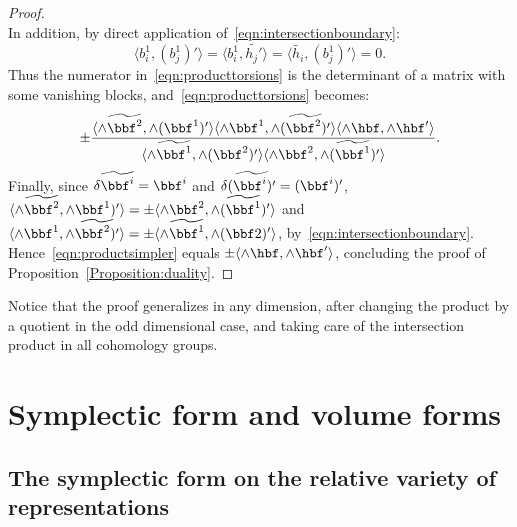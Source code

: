 \begin{proof}
\[\]
In addition, by direct application of~\eqref{eqn:intersectionboundary}:
\[
\langle { b^1_i}, (b^1_j)'\rangle =
\langle { b^1_i}, \widetilde{h_j'}\rangle =
\langle \widetilde {h_i}, (b^1_j)' \rangle=0.
\]
Thus the numerator in~\eqref{eqn:producttorsions} is the determinant of a matrix with some vanishing blocks, and~\eqref{eqn:producttorsions} becomes:
\begin{equation}\label{eqn:productsimpler}
\pm \frac{
\langle \wedge \widetilde{\bbf^2}, \wedge (\bbf^1)'\rangle
\langle \wedge {\bbf^1},\wedge \widetilde{(\bbf^2)'}\rangle
\langle \wedge {\hbf}, \wedge \hbf'\rangle }{
\langle\wedge \widetilde{\bbf^1},\wedge ({\bbf^2})' \rangle
\langle \wedge {\bbf^2},\wedge (\widetilde{\bbf^1})' \rangle }.
\end{equation}
Finally, since $\delta \widetilde{\bbf^i}= \bbf^i$ and $\delta \widetilde{(\bbf^i)'}= (\bbf^i)'$, $
\langle \wedge \widetilde{\bbf^2}, \wedge \bbf^1)'\rangle =\pm \langle \wedge {\bbf^2},\wedge (\widetilde{\bbf^1})' \rangle $ and $
\langle \wedge {\bbf^1},\wedge \widetilde{\bbf^2)'} \rangle =
\pm \langle \wedge \widetilde{\bbf^1},\wedge {(\bbf2)'} \rangle $, by~\eqref{eqn:intersectionboundary}. Hence~\eqref{eqn:productsimpler} equals $\pm \langle \wedge \hbf, \wedge \hbf'\rangle $, concluding the proof of Proposition~\ref{Proposition:duality}.
\end{proof}

\begin{rema}
Notice that the proof generalizes in any dimension, after changing the product by a quotient in the odd dimensional case, and taking care of the intersection product in all cohomology groups.
\end{rema}

\section{Symplectic form and volume forms}\label{Section:forms}

\subsection{The symplectic form on the relative variety of representations}

